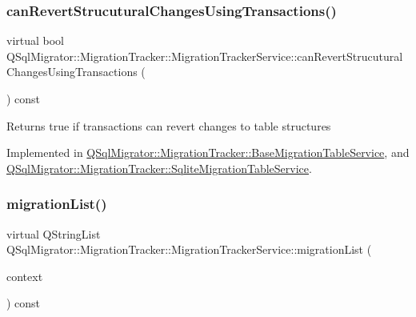 \subsubsection{\texorpdfstring{can\+Revert\+Strucutural\+Changes\+Using\+Transactions()}{canRevertStrucuturalChangesUsingTransactions()}}
{\footnotesize\ttfamily virtual bool Q\+Sql\+Migrator\+::\+Migration\+Tracker\+::\+Migration\+Tracker\+Service\+::can\+Revert\+Strucutural\+Changes\+Using\+Transactions (\begin{DoxyParamCaption}{ }\end{DoxyParamCaption}) const\hspace{0.3cm}{\ttfamily [pure virtual]}}

\begin{DoxyReturn}{Returns}
true if transactions can revert changes to table structures 
\end{DoxyReturn}


Implemented in \hyperlink{class_q_sql_migrator_1_1_migration_tracker_1_1_base_migration_table_service_aea5fa9e4804a436221180560efeab253}{Q\+Sql\+Migrator\+::\+Migration\+Tracker\+::\+Base\+Migration\+Table\+Service}, and \hyperlink{class_q_sql_migrator_1_1_migration_tracker_1_1_sqlite_migration_table_service_a6d2f747ce2a599033dee174f8e996fff}{Q\+Sql\+Migrator\+::\+Migration\+Tracker\+::\+Sqlite\+Migration\+Table\+Service}.

\mbox{\label{class_q_sql_migrator_1_1_migration_tracker_1_1_migration_tracker_service_a5de22e070fc1b4f487dbe256e1c874ef}} 
\subsubsection{\texorpdfstring{migration\+List()}{migrationList()}}
{\footnotesize\ttfamily virtual Q\+String\+List Q\+Sql\+Migrator\+::\+Migration\+Tracker\+::\+Migration\+Tracker\+Service\+::migration\+List (\begin{DoxyParamCaption}\item[{const \hyperlink{class_q_sql_migrator_1_1_command_execution_1_1_command_execution_context}{Command\+Execution\+::\+Command\+Execution\+Context} \&}]{context }\end{DoxyParamCaption}) const\hspace{0.3cm}{\ttfamily [pure virtual]}}

